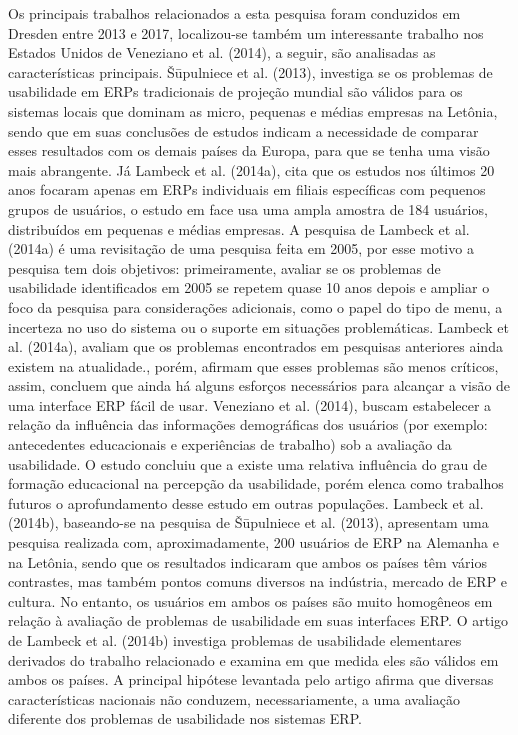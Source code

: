 Os principais trabalhos relacionados a esta pesquisa foram conduzidos em Dresden entre 2013 e 2017, localizou-se também um interessante trabalho nos Estados Unidos de Veneziano et al. (2014), a seguir, são analisadas as características principais.\newline
\indent Šūpulniece et al. (2013), investiga se os problemas de usabilidade em ERPs tradicionais de projeção mundial são válidos para os sistemas locais que dominam as micro, pequenas e médias empresas na Letônia, sendo que em suas conclusões de estudos indicam a necessidade de comparar esses resultados com os demais países da Europa, para que se tenha uma visão mais abrangente.\newline
\indent Já Lambeck et al. (2014a), cita que os estudos nos últimos 20 anos focaram apenas em ERPs individuais em filiais específicas com pequenos grupos de usuários, o estudo em face usa uma ampla amostra de 184 usuários, distribuídos em pequenas e médias empresas.\newline
\indent A pesquisa de Lambeck et al. (2014a) é uma revisitação de uma pesquisa feita em 2005, por esse motivo a pesquisa tem dois objetivos: primeiramente, avaliar se os problemas de usabilidade identificados em 2005 se repetem quase 10 anos depois e ampliar o foco da pesquisa para considerações adicionais, como o papel do tipo de menu, a incerteza no uso do sistema ou o suporte em situações problemáticas.\newline
\indent Lambeck et al. (2014a), avaliam que os problemas encontrados em pesquisas anteriores ainda existem na atualidade., porém, afirmam que esses problemas são menos críticos, assim, concluem que ainda há alguns esforços necessários para alcançar a visão de uma interface ERP fácil de usar.\newline
\indent Veneziano et al. (2014), buscam estabelecer a relação da influência das informações demográficas dos usuários (por exemplo: antecedentes educacionais e experiências de trabalho) sob a avaliação da usabilidade. O estudo concluiu que a existe uma relativa influência do grau de formação educacional na percepção da usabilidade, porém elenca como trabalhos futuros o aprofundamento desse estudo em outras populações.\newline
\indent Lambeck et al. (2014b), baseando-se na pesquisa de Šūpulniece et al. (2013), apresentam uma pesquisa realizada com, aproximadamente, 200 usuários de ERP na Alemanha e na Letônia, sendo que os resultados indicaram que ambos os países têm vários contrastes, mas também pontos comuns diversos na indústria, mercado de ERP e cultura. No entanto, os usuários em ambos os países são muito homogêneos em relação à avaliação de problemas de usabilidade em suas interfaces ERP.\newline
\indent O artigo de Lambeck et al. (2014b) investiga problemas de usabilidade elementares derivados do trabalho relacionado e examina em que medida eles são válidos em ambos os países. A principal hipótese levantada pelo artigo afirma que diversas características nacionais não conduzem, necessariamente, a uma avaliação diferente dos problemas de usabilidade nos sistemas ERP.
